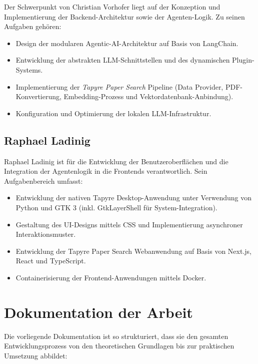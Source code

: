 Der Schwerpunkt von Christian Vorhofer liegt auf der Konzeption und Implementierung der Backend-Architektur sowie der Agenten-Logik. Zu seinen Aufgaben gehören:
\begin{itemize}
	\item Design der modularen Agentic-AI-Architektur auf Basis von LangChain.
	\item Entwicklung der abstrakten LLM-Schnittstellen und des dynamischen Plugin-Systems.
	\item Implementierung der \textit{Tapyre Paper Search} Pipeline (Data Provider, PDF-Konvertierung, Embedding-Prozess und Vektordatenbank-Anbindung).
	\item Konfiguration und Optimierung der lokalen LLM-Infrastruktur.
\end{itemize}

\subsection{Raphael Ladinig}

Raphael Ladinig ist für die Entwicklung der Benutzeroberflächen und die Integration der Agentenlogik in die Frontends verantwortlich. Sein Aufgabenbereich umfasst:
\begin{itemize}
	\item Entwicklung der nativen Tapyre Desktop-Anwendung unter Verwendung von Python und GTK 3 (inkl. GtkLayerShell für System-Integration).
	\item Gestaltung des UI-Designs mittels CSS und Implementierung asynchroner Interaktionsmuster.
	\item Entwicklung der Tapyre Paper Search Webanwendung auf Basis von Next.js, React und TypeScript.
	\item Containerisierung der Frontend-Anwendungen mittels Docker.
\end{itemize}

\section{Dokumentation der Arbeit}

Die vorliegende Dokumentation ist so strukturiert, dass sie den gesamten Entwicklungsprozess von den theoretischen Grundlagen bis zur praktischen Umsetzung abbildet:

